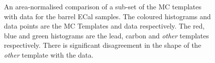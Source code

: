 \begin{figure}%
  \centering
  \hspace{1em}
  \caption{An area-normalised comparison of a sub-set of the MC templates with data for the barrel ECal samples.  The coloured histograms and data points are the MC Templates and data respectively.  The red, blue and green histograms are the lead, carbon and \textit{other} templates respectively.  There is significant disagreement in the shape of the \textit{other} template with the data.}
  \label{fig:SubsetMCTemplatesT2KDataBarrelModulesAreaNorm}
\end{figure}
